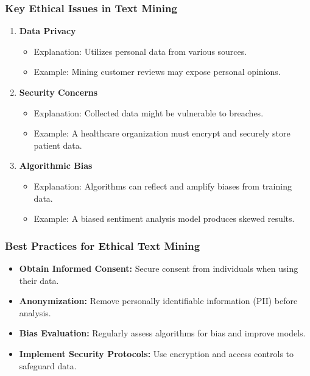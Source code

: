 \documentclass[aspectratio=169]{beamer}
\begin{document}
\begin{frame}[fragile]
    \frametitle{Key Ethical Issues in Text Mining}
    \begin{enumerate}
        \item \textbf{Data Privacy}
        \begin{itemize}
            \item Explanation: Utilizes personal data from various sources.
            \item Example: Mining customer reviews may expose personal opinions.
        \end{itemize}
        
        \item \textbf{Security Concerns}
        \begin{itemize}
            \item Explanation: Collected data might be vulnerable to breaches.
            \item Example: A healthcare organization must encrypt and securely store patient data.
        \end{itemize}
        
        \item \textbf{Algorithmic Bias}
        \begin{itemize}
            \item Explanation: Algorithms can reflect and amplify biases from training data.
            \item Example: A biased sentiment analysis model produces skewed results.
        \end{itemize}
    \end{enumerate}
\end{frame}

\begin{frame}[fragile]
    \frametitle{Best Practices for Ethical Text Mining}
    \begin{itemize}
        \item \textbf{Obtain Informed Consent:} Secure consent from individuals when using their data.
        \item \textbf{Anonymization:} Remove personally identifiable information (PII) before analysis.
        \item \textbf{Bias Evaluation:} Regularly assess algorithms for bias and improve models.
        \item \textbf{Implement Security Protocols:} Use encryption and access controls to safeguard data.
    \end{itemize}
\end{frame}
\end{document}
